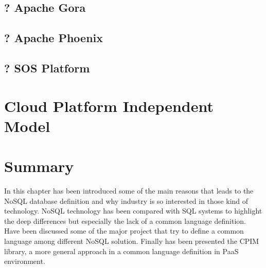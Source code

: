\subsection{? Apache Gora} 
\subsection{? Apache Phoenix}
\subsection{? SOS Platform}

\section{Cloud Platform Independent Model}

\section{Summary}
In this chapter has been introduced some of the main reasons that leads to the NoSQL database definition and why industry is so interested in those kind of technology. 
\noindent NoSQL technology has been compared with SQL systems to highlight the deep differences but especially the lack of a common language definition. Have been discussed some of the major project that try to define a common language among different NoSQL solution.
\noindent Finally has been presented the CPIM library, a more general approach in a common language definition in PaaS environment.